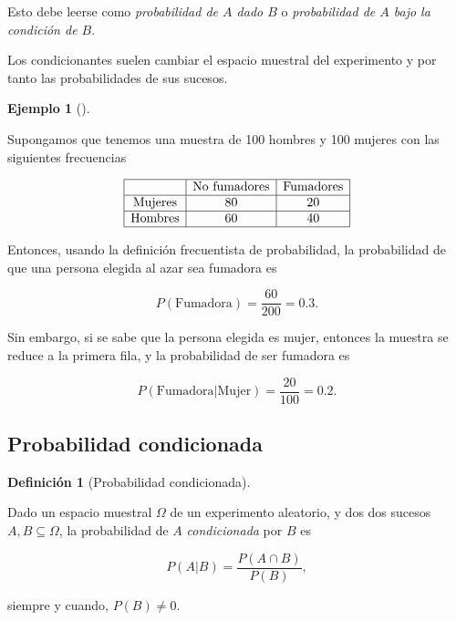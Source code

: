 \documentclass[
  a4paper,
]{scrreport}
\theoremstyle{plain}
\theoremstyle{definition}
\newtheorem{example}{Ejemplo}[chapter]
\theoremstyle{definition}
\newtheorem{definition}{Definición}[chapter]
\theoremstyle{remark}
\begin{document}
Esto debe leerse como \emph{probabilidad de \(A\) dado \(B\)} o
\emph{probabilidad de \(A\) bajo la condición de \(B\)}.

Los condicionantes suelen cambiar el espacio muestral del experimento y
por tanto las probabilidades de sus sucesos.

\begin{example}[]\protect\hypertarget{exm-sucesos-condicionados}{}\label{exm-sucesos-condicionados}

Supongamos que tenemos una muestra de 100 hombres y 100 mujeres con las
siguientes frecuencias

\[
\begin{array}{|c|c|c|}
\hline 
 & \mbox{No fumadores} & \mbox{Fumadores} \\
 \hline 
 \mbox{Mujeres} & 80 & 20 \\
 \hline
 \mbox{Hombres} & 60 & 40 \\
 \hline
\end{array}
\]

Entonces, usando la definición frecuentista de probabilidad, la
probabilidad de que una persona elegida al azar sea fumadora es

\[P(\mbox{Fumadora})= \frac{60}{200}=0.3.\]

Sin embargo, si se sabe que la persona elegida es mujer, entonces la
muestra se reduce a la primera fila, y la probabilidad de ser fumadora
es

\[P(\mbox{Fumadora}|\mbox{Mujer})=\frac{20}{100}=0.2.\]

\end{example}

\subsection{Probabilidad
condicionada}\label{probabilidad-condicionada-1}

\begin{definition}[Probabilidad
condicionada]\protect\hypertarget{def-probabilidad-condicionada}{}\label{def-probabilidad-condicionada}

Dado un espacio muestral \(\Omega\) de un experimento aleatorio, y dos
dos sucesos \(A,B\subseteq \Omega\), la probabilidad de \(A\)
\emph{condicionada} por \(B\) es

\[P(A|B) = \frac{P(A\cap B)}{P(B)},\]

siempre y cuando, \(P(B)\neq 0\).

\end{definition}
\end{document}
